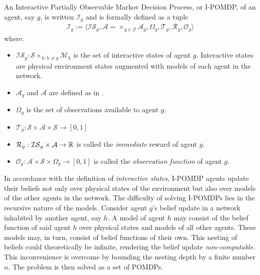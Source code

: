 \begin{definition}[I-POMDP]
\label{def:decpomdp}
An Interactive Partially Observable Markov Decision Process, or I-POMDP, of an agent, say $g$, is written $\mathcal{I}_g$ and is formally defined as a tuple
\begin{align*}
    \mathcal{I}_g := \big \langle \mathcal{IS}_g, \mathcal{A} = \times_{g \in \mathcal{G}} \mathcal{A}_g, \Omega_g, \mathcal{T}_g, \mathcal{R}_g, \mathcal{O}_g \big \rangle
  \end{align*}
where:
\begin{itemize}
    \item $\mathcal{IS}_g : \mathcal{S} \times_{h:h \neq g} \mathcal{M}_h$ is the set of interactive states of agent $g$. Interactive states are physical environment states augmented with models of each agent in the network.
    \item $\mathcal{A}_g$ and $\mathcal{A}$ are defined as in .
    \item $\Omega_g$ is the set of observations available to agent $g$.
    \item $\mathcal{T}_g : \mathcal{S} \times \mathcal{A} \times \mathcal{S} \rightarrow [0,1]$
    \item $\mathcal{R}_g : \mathcal{IS}_g \times \mathcal{A} \rightarrow \mathbb{R}$ is called the \textit{immediate} reward of agent $g$.
    \item $\mathcal{O}_g : \mathcal{A} \times \mathcal{S} \times \Omega_g \rightarrow [0,1]$ is called the \textit{observation function} of agent $g$.
\end{itemize}
\end{definition}
In accordance with the definition of \textit{interactive states}, I-POMDP agents update their beliefs not only over physical states of the environment but also over models of the other agents in the network. The difficulty of solving I-POMDPs lies in the recursive nature of the models. Consider agent $g$'s belief update in a network inhabited by another agent, say $h$. A model of agent $h$ may consist of the belief function of said agent $h$ over physical states and models of all other agents. These models may, in turn, consist of belief functions of their own. This nesting of beliefs could theoretically be infinite, rendering the belief update \textit{non-computable}. This inconvenience is overcome by bounding the nesting depth by a finite number $n$. The problem is then solved as a set of POMDPs. 

